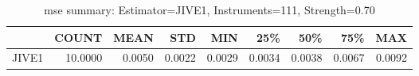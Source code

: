\begin{table}[ht]
\centering
\caption{mse summary: Estimator=JIVE1, Instruments=111, Strength=0.70}
\begin{tabular}{lrrrrrrrr}
\toprule
 & COUNT & MEAN & STD & MIN & 25\% & 50\% & 75\% & MAX \\
\midrule
JIVE1 & 10.0000 & 0.0050 & 0.0022 & 0.0029 & 0.0034 & 0.0038 & 0.0067 & 0.0092 \\
\bottomrule
\end{tabular}
\end{table}
